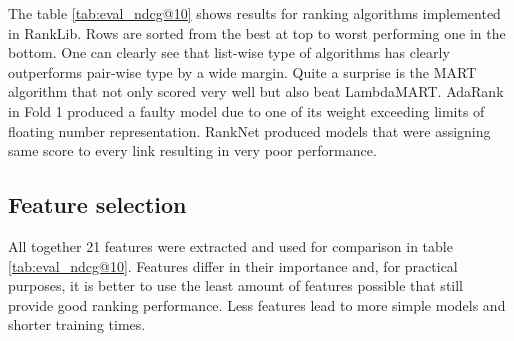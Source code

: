 The table \ref{tab:eval_ndcg@10} shows results for ranking algorithms implemented in RankLib. Rows are sorted from the best at top to worst performing one in the bottom. One can clearly see that list-wise type of algorithms has clearly outperforms pair-wise type by a wide margin. Quite a surprise is the MART algorithm that not only scored very well but also beat LambdaMART.
%
%
%
AdaRank in Fold 1 produced a faulty model due to one of its weight exceeding limits of floating number representation. RankNet produced models that were assigning same score to every link resulting in very poor performance.

\subsection{Feature selection}
All together 21 features were extracted and used for comparison in table \ref{tab:eval_ndcg@10}. Features differ in their importance and, for practical purposes, it is better to use the least amount of features possible that still provide good ranking performance. Less features lead to more simple models and shorter training times. 


